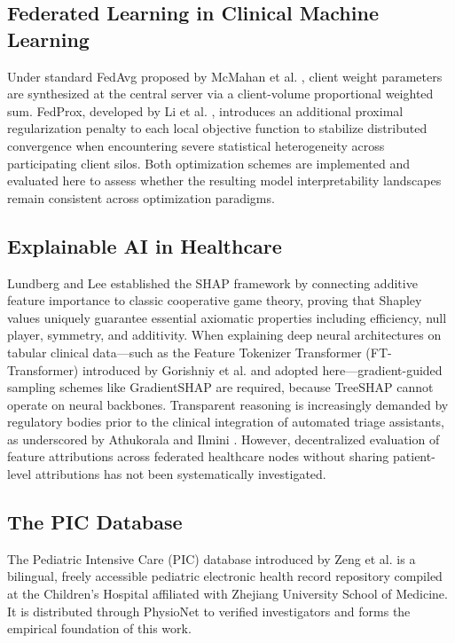 \documentclass[runningheads]{llncs}
\begin{document}
\subsection{Federated Learning in Clinical Machine Learning}
Under standard FedAvg proposed by McMahan et al. \cite{mcmahan2017fedavg}, client weight parameters are synthesized at the central server via a client-volume proportional weighted sum. FedProx, developed by Li et al. \cite{li2020fedprox}, introduces an additional proximal regularization penalty to each local objective function to stabilize distributed convergence when encountering severe statistical heterogeneity across participating client silos. Both optimization schemes are implemented and evaluated here to assess whether the resulting model interpretability landscapes remain consistent across optimization paradigms.

\subsection{Explainable AI in Healthcare}
Lundberg and Lee \cite{lundberg2017shap} established the SHAP framework by connecting additive feature importance to classic cooperative game theory, proving that Shapley values uniquely guarantee essential axiomatic properties including efficiency, null player, symmetry, and additivity. When explaining deep neural architectures on tabular clinical data---such as the Feature Tokenizer Transformer (FT-Transformer) introduced by Gorishniy et al. \cite{gorishniy2021revisiting} and adopted here---gradient-guided sampling schemes like GradientSHAP are required, because TreeSHAP cannot operate on neural backbones. Transparent reasoning is increasingly demanded by regulatory bodies prior to the clinical integration of automated triage assistants, as underscored by Athukorala and Ilmini \cite{athukorala2026explainable}. However, decentralized evaluation of feature attributions across federated healthcare nodes without sharing patient-level attributions has not been systematically investigated.

\subsection{The PIC Database}
The Pediatric Intensive Care (PIC) database introduced by Zeng et al. \cite{zeng2020pic} is a bilingual, freely accessible pediatric electronic health record repository compiled at the Children's Hospital affiliated with Zhejiang University School of Medicine. It is distributed through PhysioNet to verified investigators and forms the empirical foundation of this work.
\end{document}
